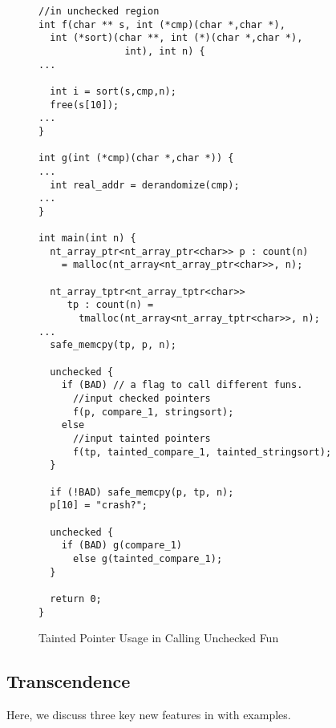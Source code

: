 \begin{figure}[t]
{\small
  \begin{lstlisting}[xleftmargin=4 mm]
//in unchecked region
int f(char ** s, int (*cmp)(char *,char *),
  int (*sort)(char **, int (*)(char *,char *),
               int), int n) {
...

  int i = sort(s,cmp,n);
  free(s[10]);
...
}

int g(int (*cmp)(char *,char *)) {
...
  int real_addr = derandomize(cmp);
...
}

int main(int n) {
  nt_array_ptr<nt_array_ptr<char>> p : count(n)
    = malloc(nt_array<nt_array_ptr<char>>, n);

  nt_array_tptr<nt_array_tptr<char>>
     tp : count(n) =
       tmalloc(nt_array<nt_array_tptr<char>>, n);
...
  safe_memcpy(tp, p, n);

  unchecked {
    if (BAD) // a flag to call different funs.
      //input checked pointers
      f(p, compare_1, stringsort); 
    else 
      //input tainted pointers
      f(tp, tainted_compare_1, tainted_stringsort);
  }

  if (!BAD) safe_memcpy(p, tp, n);
  p[10] = "crash?";
  
  unchecked {
    if (BAD) g(compare_1)
      else g(tainted_compare_1);
  }

  return 0;
}
  \end{lstlisting}
}
\caption{Tainted Pointer Usage in Calling Unchecked Fun}
\label{fig:checkedc-example-3}
\end{figure}

\subsection{\systemname Transcendence}

Here, we discuss three key new features in \systemname with examples.


